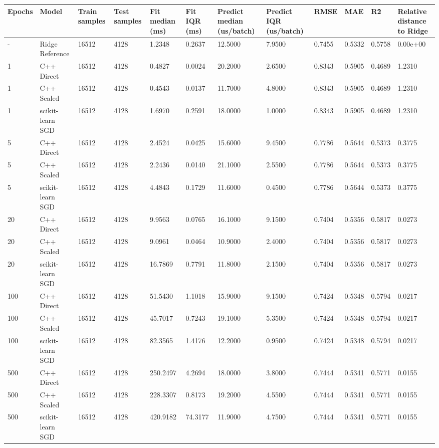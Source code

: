 \begin{table}[htbp]
\centering
\begin{tabular}{llllllllllll}
\toprule
Epochs & Model & Train samples & Test samples & Fit median (ms) & Fit IQR (ms) & Predict median (us/batch) & Predict IQR (us/batch) & RMSE & MAE & R\^2 & Relative distance to Ridge \\
\midrule
- & Ridge Reference & 16512 & 4128 & 1.2348 & 0.2637 & 12.5000 & 7.9500 & 0.7455 & 0.5332 & 0.5758 & 0.00e+00 \\
1 & C++ Direct & 16512 & 4128 & 0.4827 & 0.0024 & 20.2000 & 2.6500 & 0.8343 & 0.5905 & 0.4689 & 1.2310 \\
1 & C++ Scaled & 16512 & 4128 & 0.4543 & 0.0137 & 11.7000 & 4.8000 & 0.8343 & 0.5905 & 0.4689 & 1.2310 \\
1 & scikit-learn SGD & 16512 & 4128 & 1.6970 & 0.2591 & 18.0000 & 1.0000 & 0.8343 & 0.5905 & 0.4689 & 1.2310 \\
5 & C++ Direct & 16512 & 4128 & 2.4524 & 0.0425 & 15.6000 & 9.4500 & 0.7786 & 0.5644 & 0.5373 & 0.3775 \\
5 & C++ Scaled & 16512 & 4128 & 2.2436 & 0.0140 & 21.1000 & 2.5500 & 0.7786 & 0.5644 & 0.5373 & 0.3775 \\
5 & scikit-learn SGD & 16512 & 4128 & 4.4843 & 0.1729 & 11.6000 & 0.4500 & 0.7786 & 0.5644 & 0.5373 & 0.3775 \\
20 & C++ Direct & 16512 & 4128 & 9.9563 & 0.0765 & 16.1000 & 9.1500 & 0.7404 & 0.5356 & 0.5817 & 0.0273 \\
20 & C++ Scaled & 16512 & 4128 & 9.0961 & 0.0464 & 10.9000 & 2.4000 & 0.7404 & 0.5356 & 0.5817 & 0.0273 \\
20 & scikit-learn SGD & 16512 & 4128 & 16.7869 & 0.7791 & 11.8000 & 2.1500 & 0.7404 & 0.5356 & 0.5817 & 0.0273 \\
100 & C++ Direct & 16512 & 4128 & 51.5430 & 1.1018 & 15.9000 & 9.1500 & 0.7424 & 0.5348 & 0.5794 & 0.0217 \\
100 & C++ Scaled & 16512 & 4128 & 45.7017 & 0.7243 & 19.1000 & 5.3500 & 0.7424 & 0.5348 & 0.5794 & 0.0217 \\
100 & scikit-learn SGD & 16512 & 4128 & 82.3565 & 1.4176 & 12.2000 & 0.9500 & 0.7424 & 0.5348 & 0.5794 & 0.0217 \\
500 & C++ Direct & 16512 & 4128 & 250.2497 & 4.2694 & 18.0000 & 3.8000 & 0.7444 & 0.5341 & 0.5771 & 0.0155 \\
500 & C++ Scaled & 16512 & 4128 & 228.3307 & 0.8173 & 19.2000 & 4.5500 & 0.7444 & 0.5341 & 0.5771 & 0.0155 \\
500 & scikit-learn SGD & 16512 & 4128 & 420.9182 & 74.3177 & 11.9000 & 4.7500 & 0.7444 & 0.5341 & 0.5771 & 0.0155 \\
\bottomrule
\end{tabular}
\end{table}
